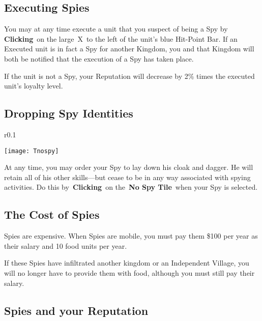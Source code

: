 \subsection{Executing Spies}

You may at any time execute a unit that you suspect of being a Spy by \textbf{Clicking} on the large X to the left of the unit’s blue Hit-Point Bar. If an Executed unit is in fact a Spy for another Kingdom, you and that Kingdom will both be notified that the execution of a Spy has taken place.


If the unit is not a Spy, your Reputation will decrease by 2\% times the executed unit’s loyalty level.

\subsection{Dropping Spy Identities}

\begin{wrapfigure}{r}{0.1\textwidth}
	\vspace{-20pt}
	\begin{center}
		\texttt{[image: Tnospy]}
	\end{center}
	\vspace{-20pt}
\end{wrapfigure}

At any time, you may order your Spy to lay down his cloak and dagger. He will retain all of his other skills---but cease to be in any way associated with spying activities. Do this by \textbf{Clicking} on the \textbf{No Spy Tile} when your Spy is selected.

\subsection{The Cost of Spies}

Spies are expensive. When Spies are mobile, you must pay them \$100 per year as their salary and 10 food units per year.

If these Spies have infiltrated another kingdom or an Independent Village, you will no longer have to provide them with food, although you must still pay their salary.

\subsection{Spies and your Reputation}

